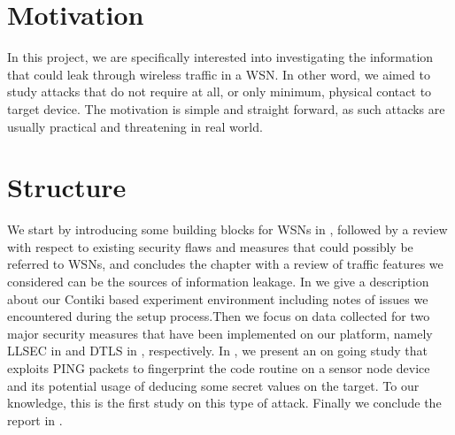 \section{Motivation}
In this project, we are specifically interested into investigating the information that could leak through wireless traffic in a WSN. In other word, we aimed to study attacks that do not require at all, or only minimum, physical contact to target device. The motivation is simple and straight forward, as such attacks are usually practical and threatening in real world.

\section{Structure}
We start by introducing some building blocks for WSNs in , followed by a review with respect to existing security flaws and measures that could possibly be referred to WSNs, and concludes the chapter with a review of traffic features we considered can be the sources of information leakage. In  we give a description about our Contiki\cite{Contiki} based experiment environment including notes of issues we encountered during the setup process.Then we focus on data collected for two major security measures that have been implemented on our platform, namely LLSEC in  and DTLS in , respectively. In , we present an on going study that exploits PING packets to fingerprint the code routine on a sensor node device and its potential usage of deducing some secret values on the target. To our knowledge, this is the first study on this type of attack. Finally we conclude the report in .